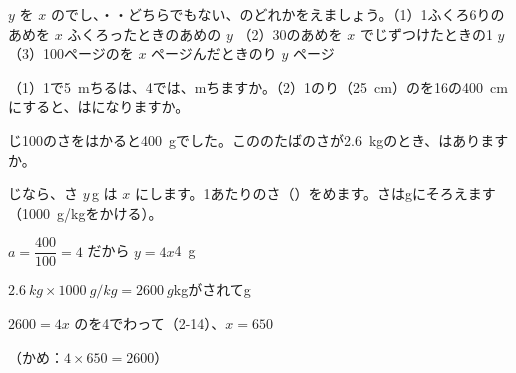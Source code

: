 \begingroup{}%
\noindent\begin{minipage}[t]{0.49\linewidth}
\begin{jibun}
$y$ を $x$ のでし、・・どちらでもない、のどれかをえましょう。（1）1ふくろ6りのあめを $x$ ふくろったときのあめの $y$ （2）30のあめを $x$ でじずつけたときの1 $y$ （3）100ページのを $x$ ページんだときのり $y$ ページ
\end{jibun}
\end{minipage}\hfill
\begin{minipage}[t]{0.49\linewidth}
\begin{jibun}
（1）1で\qty{5}{m}ちるは、4では、mちますか。（2）1のり（\qty{25}{cm}）のを16の\qty{400}{cm}にすると、はになりますか。
\end{jibun}
\end{minipage}\par
\endgroup

\begin{reidai}[\R{比例}{ひ|れい}を\R{使}{つか}って、\R{数}{かぞ}えずに\R{数}{かず}を\R{求}{もと}める]
じ100のさをはかると\qty{400}{g}でした。こののたばのさが\qty{2.6}{kg}のとき、はありますか。\par
\kangaekata {}じなら、さ $y$\,g は $x$ にします。1あたりのさ（）をめます。さはgにそろえます（\qty{1000}{g/kg}をかける）。\par
\shiki $a=\dfrac{400}{100}=4$ だから $y=4x$\qty{4}{g}\par
\hspace*{2.6\zw}$\qty{2.6}{kg}\times\qty{1000}{g/kg}=\qty{2600}{g}$\quad kgがされてg\par
\hspace*{2.6\zw}$2600=4x$ のを4でわって（2-14）、$x=650$\par
{}（かめ：$4\times650=2600$）
\end{reidai}

